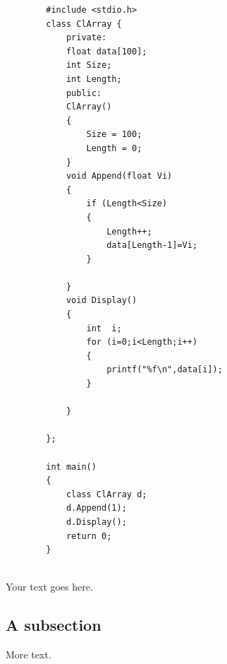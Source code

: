 \documentclass[11pt]{article} %
\begin{document}
	\begin{lstlisting}
		#include <stdio.h>
		class ClArray {
			private:
			float data[100];
			int Size;
			int Length;
			public:
			ClArray()
			{
				Size = 100;
				Length = 0;
			}
			void Append(float Vi)
			{
				if (Length<Size)
				{
					Length++;
					data[Length-1]=Vi;
				}
				
			}
			void Display() 
			{
				int  i;
				for (i=0;i<Length;i++)
				{
					printf("%f\n",data[i]);
				}
				
			}
			
		};
		
		int main()
		{
			class ClArray d;
			d.Append(1);
			d.Display();
			return 0;
		}
		
	\end{lstlisting}
	
	Your text goes here.
	
	\subsection{A subsection}
	
	More text.
	
\end{document}
